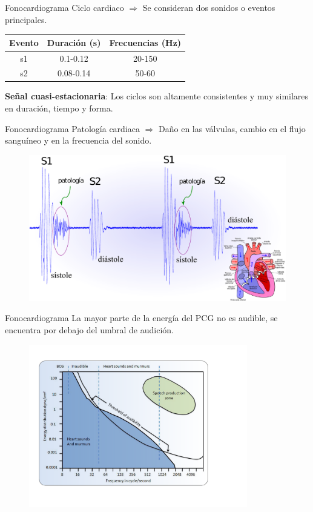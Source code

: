 \documentclass[xcolor=table]{beamer}
\begin{document}
\begin{frame}{Fonocardiograma}
	Ciclo cardiaco $\Rightarrow$ Se consideran dos sonidos o eventos principales.
		\begin{table}
			\begin{tabular}{c|c|c}
			\hline
			Evento & Duraci\'on (s)& Frecuencias (Hz) \\
			\hline
			s1     & 0.1-0.12      & 20-150\\
			\hline
			s2     & 0.08-0.14	   & 50-60 \\
			\hline
			\end{tabular}
		\end{table}
	\textbf{Se\~nal cuasi-estacionaria}: Los ciclos son altamente consistentes y muy similares en duraci\'on, tiempo y forma.
\end{frame}

\begin{frame}{Fonocardiograma}
	Patolog\'ia cardiaca $\Rightarrow$ Da\~no en las v\'alvulas, cambio en el flujo sangu\'ineo y en la frecuencia del sonido.
		\begin{figure}
			\centering
		\includegraphics[scale=0.37]{pcg_waveform.pdf}
		\end{figure}
\end{frame}

\begin{frame}{Fonocardiograma}
	La mayor parte de la energ\'ia del PCG no es audible, se encuentra por debajo del umbral de audici\'on.
	
	\begin{figure}
	\centering
	\includegraphics[width=0.85\textwidth]{PCG_audition.pdf}
	\end{figure}
\end{frame}
\end{document}
